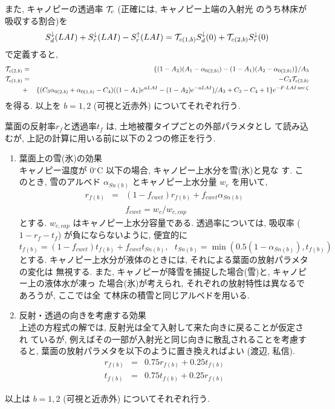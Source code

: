 また, キャノピーの透過率 ${\cal{T}}_c$ (正確には, キャノピー上端の入射光
のうち林床が吸収する割合)を
\begin{eqnarray}
 S^{\downarrow}_d(LAI) + S^{\downarrow}_r(LAI) - S^{\uparrow}_r(LAI) 
= {\cal{T}}_{c(1,b)} S^{\downarrow}_d(0) 
+ {\cal{T}}_{c(2,b)} S^{\downarrow}_r(0) 
\end{eqnarray}
で定義すると, 
\begin{eqnarray}
  {\cal{T}}_{c(2,b)}&=& \{ ( 1 - A_2 )( A_1 - \alpha_{0(2,b)} )
                      - ( 1 - A_1 )( A_2 - \alpha_{0(2,b)} ) \} / A_3 \\
 {\cal{T}}_{c(1,b)}&=& - C_3 {\cal{T}}_{c(2,b)} \nonumber \\
& + &              \{ ( C_3 \alpha_{0(2,b)} + \alpha_{0(1,b)} -C_4 )
                   ( ( 1 - A_1 ) e^{ a LAI } 
                   - ( 1 - A_2 ) e^{-a LAI } )  / A_3
                   + C_3 - C_4 +1 \} e^{- F\cdot LAI\cdot \sec\zeta}
\nonumber \\
\end{eqnarray}                   
を得る. 
以上を $b=1, 2$ (可視と近赤外) についてそれぞれ行う. 

葉面の反射率$r_f$と透過率$t_f$ は, 土地被覆タイプごとの外部パラメタとし
て読み込むが, 上記の計算に用いる前に以下の２つの修正を行う. 
\begin{enumerate}
 \item 葉面上の雪(氷)の効果 \\
 キャノピー温度が 0$^{\circ}$C 以下の場合, キャノピー上水分を雪(氷)と見な
 す. このとき, 雪のアルベド $\alpha_{Sn(b)}$ とキャノピー上水分量 $w_c$
 を用いて, 
\begin{eqnarray}
 r_{f(b)} &=& ( 1 - f_{cwet} ) r_{f(b)} 
         + f_{cwet} \alpha_{Sn(b)} \\
 && f_{cwet} = {w_c}/w_{c,cap}
\end{eqnarray}
 とする. $w_{c,cap}$ はキャノピー上水分容量である. 
 透過率については, 吸収率 ($1-r_f-t_f$) が負にならないように, 便宜的に
\begin{equation}
 t_{f(b)} = ( 1 - f_{cwet} ) t_{f(b)} 
         + f_{cwet} t_{Sn(b)}, \ \ \ 
 t_{Sn(b)} = \min( 0.5(1 - \alpha_{Sn(b)}), t_{f(b)} )
\end{equation}
 とする. 
 キャノピー上水分が液体のときには, それによる葉面の放射パラメタの変化は
 無視する. 
 また, キャノピーが降雪を捕捉した場合(雪)と, キャノピー上の液体水が凍っ
 た場合(氷)が考えられ, それぞれの放射特性は異なるであろうが, ここでは全
 て林床の積雪と同じアルベドを用いる. 
 \item 反射・透過の向きを考慮する効果 \\
 上述の方程式の解では, 反射光は全て入射して来た向きに戻ることが仮定され
 ているが, 例えばその一部が入射光と同じ向きに散乱されることを考慮すると, 
 葉面の放射パラメタを以下のように置き換えればよい (渡辺, 私信). 
\begin{eqnarray}
  r_{f(b)} &=& 0.75 r_{f(b)} + 0.25 t_{f(b)} \\
  t_{f(b)} &=& 0.75 t_{f(b)} + 0.25 r_{f(b)}
\end{eqnarray}
\end{enumerate}
以上は $b=1, 2$ (可視と近赤外) についてそれぞれ行う. 

